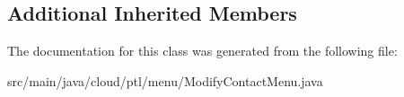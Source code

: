 \subsection*{Additional Inherited Members}


The documentation for this class was generated from the following file\+:\begin{DoxyCompactItemize}
\item 
src/main/java/cloud/ptl/menu/Modify\+Contact\+Menu.\+java\end{DoxyCompactItemize}

